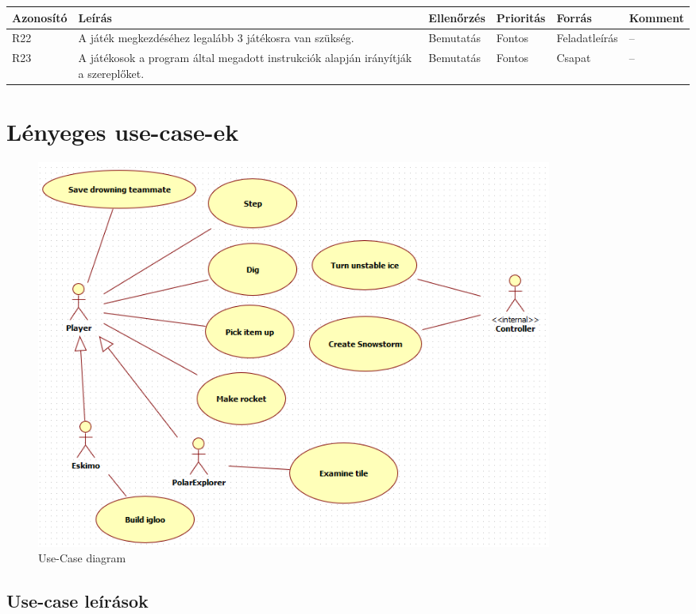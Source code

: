 \begin{longtable}{| l | p{3cm} | l | l | l | l |}
\hline
\textbf{Azonosító}   & \textbf{Leírás} & \textbf{Ellenőrzés} & \textbf{Prioritás} & \textbf{Forrás} & \textbf{Komment} \tabularnewline
\hline\hline
R22 & A játék megkezdéséhez legalább 3 játékosra van szükség. & Bemutatás & Fontos & Feladatleírás & -- \tabularnewline
\hline
R23 & A játékosok a program által megadott instrukciók alapján irányítják a szereplőket. & Bemutatás & Fontos & Csapat & -- \tabularnewline
\hline
\end{longtable}


\section{Lényeges use-case-ek}
\begin{figure}[h]
	\begin{center}
		\includegraphics[width=17cm]{chapters/chapter02/use-case.png}
		\caption{Use-Case diagram}
		\label{fig:usecase}
	\end{center}
\end{figure}

\subsection{Use-case leírások}


